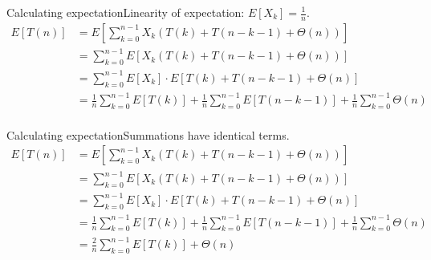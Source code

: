 \documentclass{beamer}
\begin{document}
\begin{frame}{Calculating expectation}{Linearity of expectation: $E[X_k] = \frac{1}{n}$.}
    \begin{equation*}
        \begin{split}
E[T(n)] &= E\left[ \sum\limits_{k=0}^{n-1} X_k(T(k) + T(n - k - 1) + \Theta(n)) \right] \\
        &= \sum\limits_{k=0}^{n-1} E\left[ X_k(T(k) + T(n - k - 1) + \Theta(n)) \right] \\
        &= \sum\limits_{k=0}^{n-1} E[X_k] \cdot E[T(k) + T(n - k - 1) + \Theta(n)] \\
        &= \frac{1}{n}\sum\limits_{k=0}^{n-1} E[T(k)] +
           \frac{1}{n}\sum\limits_{k=0}^{n-1} E[T(n - k - 1)] +
           \frac{1}{n}\sum\limits_{k=0}^{n-1} \Theta(n) \\
        \end{split}
    \end{equation*}
\end{frame}

\begin{frame}{Calculating expectation}{Summations have identical terms.}
    \begin{equation*}
        \begin{split}
E[T(n)] &= E\left[ \sum\limits_{k=0}^{n-1} X_k(T(k) + T(n - k - 1) + \Theta(n)) \right] \\
        &= \sum\limits_{k=0}^{n-1} E\left[ X_k(T(k) + T(n - k - 1) + \Theta(n)) \right] \\
        &= \sum\limits_{k=0}^{n-1} E[X_k] \cdot E[T(k) + T(n - k - 1) + \Theta(n)] \\
        &= \frac{1}{n}\sum\limits_{k=0}^{n-1} E[T(k)] +
           \frac{1}{n}\sum\limits_{k=0}^{n-1} E[T(n - k - 1)] +
           \frac{1}{n}\sum\limits_{k=0}^{n-1} \Theta(n) \\
        &= \frac{2}{n}\sum\limits_{k=0}^{n-1} E[T(k)] + \Theta(n) \\
        \end{split}
    \end{equation*}
\end{frame}
\end{document}
